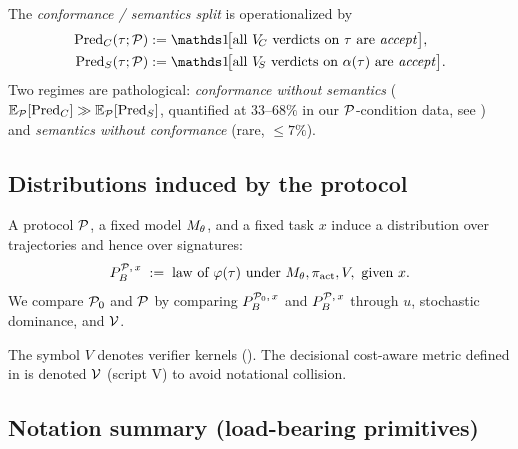 The \emph{conformance / semantics split} is operationalized by
\begin{align}
  \PredC(\tau; \proto) &:= \ind\!\big[\text{all $\VerC$ verdicts on $\tau$ are \emph{accept}}\big], \label{eq:predC} \\
  \PredS(\tau; \proto) &:= \ind\!\big[\text{all $\VerS$ verdicts on $\artbag(\tau)$ are \emph{accept}}\big]. \label{eq:predS}
\end{align}
Two regimes are pathological: \emph{conformance without semantics} ($\mathbb{E}_{\mathcal{P}}[\mathrm{Pred}_C] \gg \mathbb{E}_{\mathcal{P}}[\mathrm{Pred}_S]$, quantified at $33$--$68\%$ in our $\mathcal{P}$-condition data, see ) and \emph{semantics without conformance} (rare, $\le 7\%$).

\subsection{Distributions induced by the protocol}

A protocol $\mathcal{P}$, a fixed model $M_\theta$, and a fixed task $x$ induce a distribution over trajectories and hence over signatures:
\begin{equation}
  P_B^{\mathcal{P},\,x} \;:=\; \text{law of } \varphi(\tau) \text{ under } M_\theta, \pi_{\mathrm{act}}, V, \text{ given } x.
  \label{eq:protocol-distributions}
\end{equation}
We compare $\mathcal{P}_0$ and $\mathcal{P}$ by comparing $P_B^{\mathcal{P}_0,\,x}$ and $P_B^{\mathcal{P},\,x}$ through $u$, stochastic dominance, and $\mathcal{V}$.

\begin{remark}
The symbol $V$ denotes verifier kernels (). The decisional cost-aware metric defined in  is denoted $\mathcal{V}$ (script V) to avoid notational collision.
\end{remark}

\subsection{Notation summary (load-bearing primitives)}

